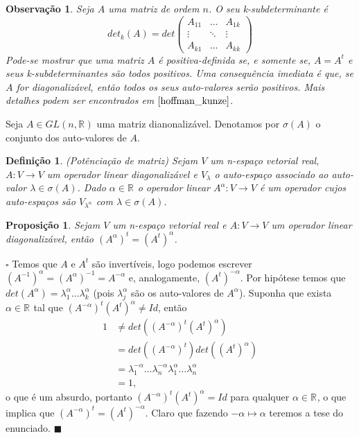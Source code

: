 \documentclass[12pt]{book}
\newtheorem{definicao}[teorema]{Definição}
\newtheorem{observacao}[teorema]{Observação}
\newtheorem{proposicao}[teorema]{Proposição}
\newenvironment{prova}[1]{$\square$ #1}{\hfill$\blacksquare$}
\newcommand{\generalgroup}[2]{GL(#1, #2)}
\newcommand{\generalgroupreal}[1]{\generalgroup{#1}{\real{}}}
\newcommand{\real}[1]{\mathbb{R}^{#1}}
\begin{document}
	\begin{observacao}\label{observacao_matriz_positiva_definida}
		Seja $A$ uma matriz de ordem $n$. O seu k-subdeterminante é
		$$
		det_{k}(A) =
		det \left(
		\begin{array}{ccc}
		A_{11} & \dots & A_{1k}
		\\
		\vdots & \ddots & \vdots
		\\
		A_{k1} & \dots & A_{kk}
		\end{array}
		\right)
		$$
		Pode-se mostrar que uma matriz $A$ é positiva-definida se, e somente se, $A=A^{t}$ e seus k-subdeterminantes são todos positivos. Uma consequência imediata é que, se $A$ for diagonalizável, então todos os seus auto-valores serão positivos. Mais detalhes podem ser encontrados em $\cite{hoffman_kunze}$.
	\end{observacao}

	Seja $A \in \generalgroupreal{n}$ uma matriz dianonalizável. Denotamos por $\sigma(A)$ o conjunto dos auto-valores de $A$.

	\begin{definicao}\label{definicao_potenciacao_matriz}
		(Potênciação de matriz) Sejam $V$ um n-espaço vetorial real, $A:V \to V$ um operador linear diagonalizável e $V_{\lambda}$ o auto-espaço associado ao auto-valor $\lambda \in \sigma(A)$. Dado $\alpha \in \real{}$ o operador linear $A^{\alpha}:V \to V$ é um operador cujos auto-espaços são $V_{\lambda^{\alpha}}$ com $\lambda \in \sigma(A)$.
	\end{definicao}
	
	\begin{proposicao}\label{proposicao_transposta_potenciacao_matriz}
		Sejam $V$ um n-espaço vetorial real e $A:V\to V$ um operador linear diagonalizável, então $(A^{\alpha})^{t}=(A^{t})^{\alpha}$.
	\end{proposicao}
	\begin{prova}
		Temos que $A$ e $A^{t}$ são invertíveis, logo podemos escrever $(A^{-1})^{\alpha}=(A^{\alpha})^{-1}=A^{-\alpha}$ e, analogamente, $(A^{t})^{-\alpha}$. Por hipótese temos que $det(A^{\alpha}) = \lambda_{1}^{\alpha} \dots \lambda_{k}^{\alpha}$ (pois $\lambda_{j}^{\alpha}$ são os auto-valores de $A^{\alpha}$). Suponha que exista $\alpha \in \real{}$ tal que $(A^{-\alpha})^{t}(A^{t})^{\alpha} \neq Id$, então 
		$$
		\begin{aligned}
		1 &\neq det((A^{-\alpha})^{t}(A^{t})^{\alpha}) 
		\\
		&= det((A^{-\alpha})^{t})det((A^{t})^{\alpha})
		\\
		&= \lambda_{1}^{-\alpha} \dots \lambda_{n}^{-\alpha}\lambda_{1}^{\alpha} \dots \lambda_{n}^{\alpha}
		\\
		&=1,
		\end{aligned}
		$$
			o que é um absurdo, portanto $(A^{-\alpha})^{t}(A^{t})^{\alpha} =Id$ para qualquer $\alpha \in \real{}$, o que implica que $(A^{-\alpha})^{t}=(A^{t})^{-\alpha}$. Claro que fazendo $-\alpha \mapsto \alpha$ teremos a tese do enunciado.
	\end{prova}
	
\end{document}

